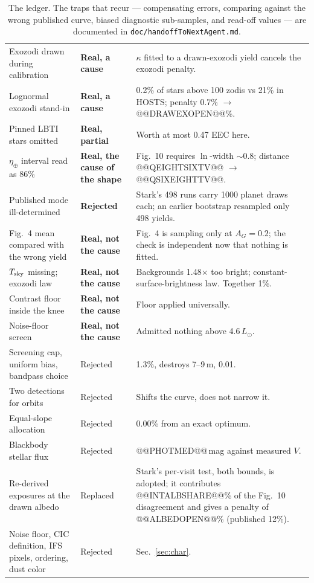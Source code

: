 \documentclass[11pt,a4paper]{article}
\begin{document}
\begin{table}[htbp]
\begin{tabular}{p{4.6cm}p{2.6cm}p{8.0cm}}
Exozodi drawn during calibration & \textbf{Real, a cause} & $\kappa$ fitted to a drawn-exozodi yield cancels the exozodi penalty. \\
Lognormal exozodi stand-in & \textbf{Real, a cause} & 0.2\% of stars above 100 zodis vs 21\% in HOSTS; penalty 0.7\% $\to$ @@DRAWEXOPEN@@\%. \\
Pinned LBTI stars omitted & \textbf{Real, partial} & Worth at most 0.47 EEC here. \\
$\eta_\oplus$ interval read as 86\% & \textbf{Real, the cause of the shape} & Fig.~10 requires $\ln$-width $\sim$0.8; distance @@QEIGHTSIXTV@@ $\to$ @@QSIXEIGHTTV@@. \\
Published mode ill-determined & \textbf{Rejected} & Stark's 498 runs carry 1000 planet draws each; an earlier bootstrap resampled only 498 yields. \\
Fig.~4 mean compared with the wrong yield & \textbf{Real, not the cause} & Fig.~4 is sampling only at $A_G = 0.2$; the check is independent now that nothing is fitted. \\
$T_{\rm sky}$ missing; exozodi law & \textbf{Real, not the cause} & Backgrounds 1.48$\times$ too bright; constant-surface-brightness law. Together 1\%. \\
Contrast floor inside the knee & \textbf{Real, not the cause} & Floor applied universally. \\
Noise-floor screen & \textbf{Real, not the cause} & Admitted nothing above 4.6\,$L_\odot$. \\
Screening cap, uniform bias, bandpass choice & Rejected & 1.3\%, destroys 7--9\,m, 0.01. \\
Two detections for orbits & Rejected & Shifts the curve, does not narrow it. \\
Equal-slope allocation & Rejected & 0.00\% from an exact optimum. \\
Blackbody stellar flux & Rejected & @@PHOTMED@@\,mag against measured $V$. \\
Re-derived exposures at the drawn albedo & Replaced & Stark's per-visit test, both bounds, is adopted; it contributes @@INTALBSHARE@@\% of the Fig.~10 disagreement and gives a penalty of @@ALBEDOPEN@@\% (published 12\%). \\
Noise floor, CIC definition, IFS pixels, ordering, dust color & Rejected & Sec.~\ref{sec:char}. \\
\bottomrule
\end{tabular}
\caption{The ledger. The traps that recur --- compensating errors, comparing against the wrong
published curve, biased diagnostic sub-samples, and read-off values --- are documented in
\texttt{doc/handoffToNextAgent.md}.}
\end{table}
\end{document}
